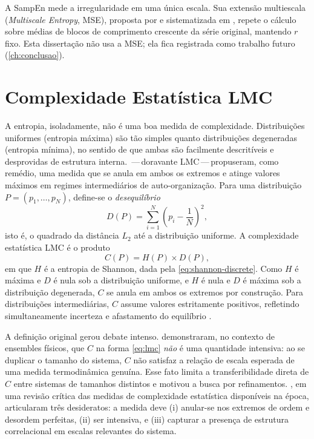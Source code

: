A SampEn mede a irregularidade em uma única escala. Sua extensão
multiescala (\emph{Multiscale Entropy}, MSE), proposta por
 e sistematizada em , repete o
cálculo sobre médias de blocos de comprimento crescente da série original,
mantendo $r$ fixo. Esta dissertação não usa a MSE; ela fica registrada
como trabalho futuro (\autoref{ch:conclusao}).

\section{Complexidade Estatística LMC}
\label{sec:lmc}

A entropia, isoladamente, não é uma boa medida de complexidade.
Distribuições uniformes (entropia máxima) são tão simples quanto
distribuições degeneradas (entropia mínima), no sentido de que ambas
são facilmente descritíveis e desprovidas de estrutura interna.
\,---\,doravante LMC\,---\,propuseram, como
remédio, uma medida que se anula em ambos os extremos e atinge
valores máximos em regimes intermediários de auto-organização. Para
uma distribuição $P = (p_1, \ldots, p_N)$, define-se o
\emph{desequilíbrio}
\begin{equation}
  D(P) = \sum_{i=1}^{N} \left( p_i - \frac{1}{N} \right)^{2},
  \label{eq:lmc-disequilibrium}
\end{equation}
isto é, o quadrado da distância $L_2$ até a distribuição uniforme.
A complexidade estatística LMC é o produto
\begin{equation}
  C(P) = H(P) \times D(P),
  \label{eq:lmc}
\end{equation}
em que $H$ é a entropia de Shannon, dada pela
\autoref{eq:shannon-discrete}. Como $H$ é máxima e $D$ é nula sob a
distribuição uniforme, e $H$ é nula e $D$ é máxima sob a distribuição
degenerada, $C$ se anula em ambos os extremos por construção. Para
distribuições intermediárias, $C$ assume valores estritamente
positivos, refletindo simultaneamente incerteza e afastamento do
equilíbrio \cite{lmc1995}.

A definição original gerou debate intenso. 
demonstraram, no contexto de ensembles físicos, que $C$ na forma
\autoref{eq:lmc} \emph{não} é uma quantidade intensiva: ao se
duplicar o tamanho do sistema, $C$ não satisfaz a relação de
escala esperada de uma medida termodinâmica genuína. Esse fato
limita a transferibilidade direta de $C$ entre sistemas de
tamanhos distintos e motivou a busca por refinamentos.
, em uma revisão crítica das medidas de
complexidade estatística disponíveis na época, articularam três
desideratos: a medida deve (i) anular-se nos extremos de ordem e
desordem perfeitas, (ii) ser intensiva, e (iii) capturar a presença
de estrutura correlacional em escalas relevantes do sistema.

